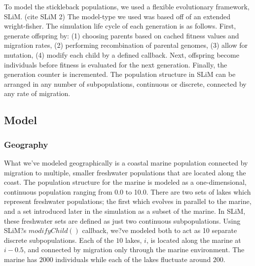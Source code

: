 \documentclass{article}
\begin{document}
To model the stickleback populations, we used a flexible evolutionary framework, SLiM. (cite SLiM 2) 
The model-type we used was based off of an extended wright-fisher. 
The simulation life cycle of each generation is as follows.
First, 
generate offspring by:
(1) choosing parents based on cached fitness values and migration rates, 
(2) performing recombination of parental genomes, 
(3) allow for mutation, 
(4) modify each child by a defined callback. 
Next, 
offspring become individuals before fitness is evaluated for the next generation.
Finally,
the generation counter is incremented. 
The population structure in SLiM can be arranged in any number of subpopulations, 
continuous or discrete, connected by any rate of migration. 


\subsection{Model}

\subsubsection*{Geography}



What we've modeled geographically is a coastal marine population 
connected by migration to multiple, smaller freshwater populations that are located along the coast.
The population structure for the marine is modeled as a one-dimensional, continuous population
ranging from 0.0 to 10.0.
There are two sets of lakes which represent freshwater populations; 
the first which evolves in parallel to the marine, 
and a set introduced later in the simulation as a subset of the marine. 
In SLiM, these freshwater sets are defined as just two continuous subpopulations. 
Using SLiM?s $modifyChild()$ callback, we?ve modeled both to act as 10 separate discrete subpopulations. 
Each of the $10$ lakes, $i$, is located along the marine at $i - 0.5$, 
and connected by migration only through the marine environment. 
The marine has $2000$ individuals while 
each of the lakes fluctuate around $200$. 
\end{document}
